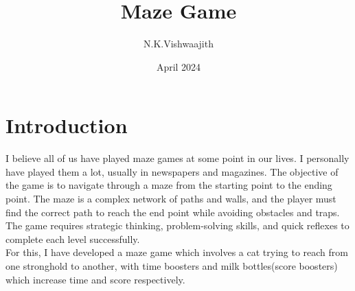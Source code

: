 \documentclass{article}
\title{Maze Game}
\author{N.K.Vishwaajith}
\date{April 2024}
\begin{document}
\maketitle
\tableofcontents
\newpage
\section{Introduction}
I believe all of us have played maze games at some point in our lives. I personally have played them a lot, usually in newspapers and magazines. The objective of the game is to navigate through a maze from the starting point to the ending point. The maze is a complex network of paths and walls, and the player must find the correct path to reach the end point while avoiding obstacles and traps. The game requires strategic thinking, problem-solving skills, and quick reflexes to complete each level successfully. \\
For this,  I have developed a maze game which involves a cat trying to reach from one stronghold to another, with time boosters and milk bottles(score boosters) which increase time and score respectively.\\
\end{document}
